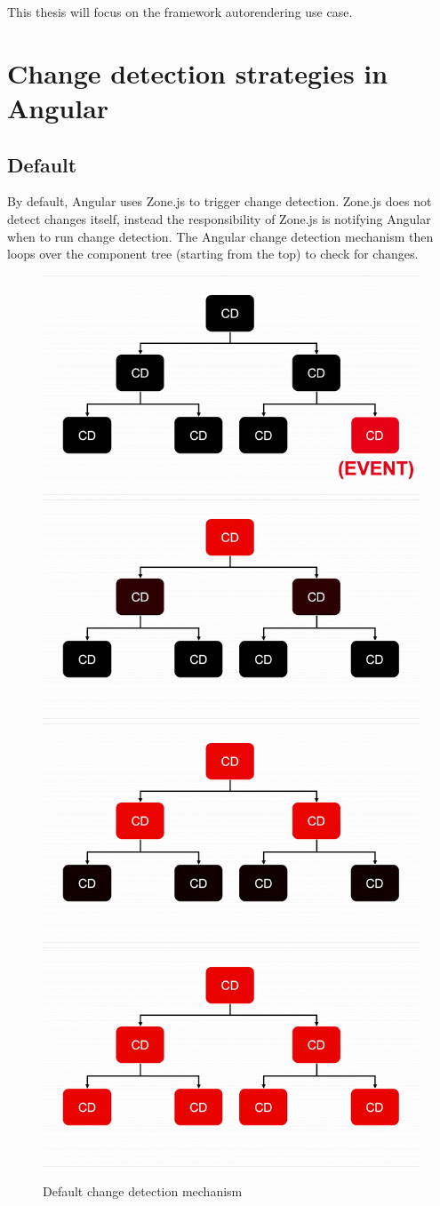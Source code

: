 This thesis will focus on the framework autorendering use case.



\section{Change detection strategies in Angular}
\subsection{Default}
By default, Angular uses Zone.js to trigger change detection. Zone.js does not detect changes itself, instead the responsibility of Zone.js is notifying Angular when to run change detection. \autocite{Inatomi2020} The Angular change detection mechanism then loops over the component tree (starting from the top) to check for changes.
\begin{figure}[h!]
    \caption{Default change detection mechanism}
    \centering
    \includegraphics[width=.49\textwidth]{img/cycle1.png} 
    \includegraphics[width=.49\textwidth]{img/cycle2.png} 
    \includegraphics[width=.49\textwidth]{img/cycle3.png} 
    \includegraphics[width=.49\textwidth]{img/cycle4.png} 
\end{figure}


